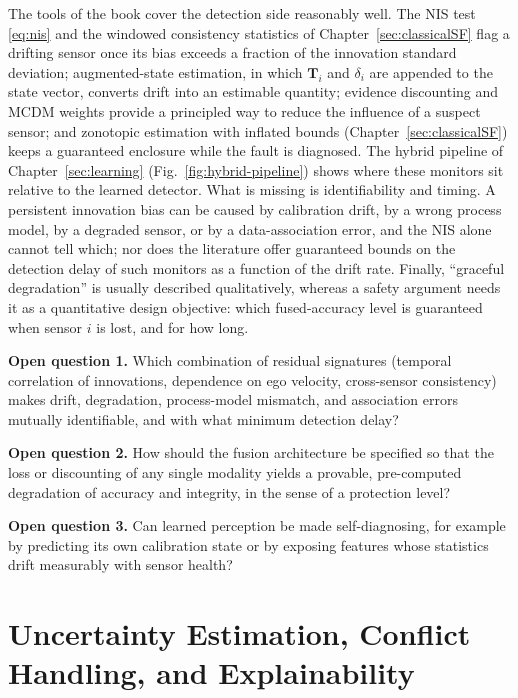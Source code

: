 The tools of the book cover the detection side reasonably well. The NIS test \eqref{eq:nis} and the windowed consistency statistics of Chapter~\ref{sec:classicalSF} flag a drifting sensor once its bias exceeds a fraction of the innovation standard deviation; augmented-state estimation, in which $\mathbf{T}_i$ and $\delta_i$ are appended to the state vector, converts drift into an estimable quantity; evidence discounting and MCDM weights provide a principled way to reduce the influence of a suspect sensor; and zonotopic estimation with inflated bounds (Chapter~\ref{sec:classicalSF}) keeps a guaranteed enclosure while the fault is diagnosed. The hybrid pipeline of Chapter~\ref{sec:learning} (Fig.~\ref{fig:hybrid-pipeline}) shows where these monitors sit relative to the learned detector. What is missing is identifiability and timing. A persistent innovation bias can be caused by calibration drift, by a wrong process model, by a degraded sensor, or by a data-association error, and the NIS alone cannot tell which; nor does the literature offer guaranteed bounds on the detection delay of such monitors as a function of the drift rate. Finally, ``graceful degradation'' is usually described qualitatively, whereas a safety argument needs it as a quantitative design objective: which fused-accuracy level is guaranteed when sensor $i$ is lost, and for how long.

\begin{list4a}
    \item \textbf{Open question 1.} Which combination of residual signatures (temporal correlation of innovations, dependence on ego velocity, cross-sensor consistency) makes drift, degradation, process-model mismatch, and association errors mutually identifiable, and with what minimum detection delay?
    \item \textbf{Open question 2.} How should the fusion architecture be specified so that the loss or discounting of any single modality yields a provable, pre-computed degradation of accuracy and integrity, in the sense of a protection level?
    \item \textbf{Open question 3.} Can learned perception be made self-diagnosing, for example by predicting its own calibration state or by exposing features whose statistics drift measurably with sensor health?
\end{list4a}

\section{Uncertainty Estimation, Conflict Handling, and Explainability}
\label{subsec:oc-uncertainty}

